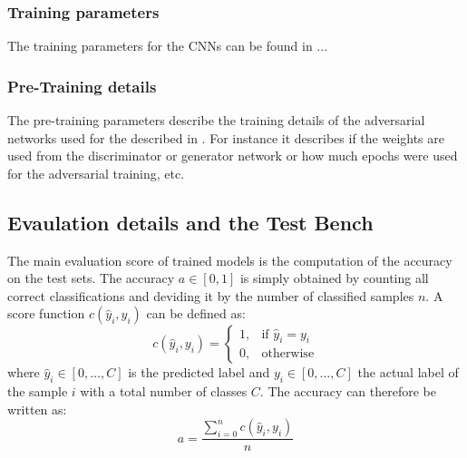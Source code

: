 
\subsubsection{Training parameters}
The training parameters for the CNNs can be found in ...




\subsubsection{Pre-Training details}

The pre-training parameters describe the training details of the adversarial networks used for the  described in .
For instance it describes if the weights are used from the discriminator or generator network or how much epochs were used for the adversarial training, etc.


%
%



\subsection{Evaulation details and the Test Bench}\label{sec:exp_details_tb}
The main evaluation score of trained models is the computation of the accuracy on the test sets.
The accuracy $a \in [0, 1]$ is simply obtained by counting all correct classifications and deviding it by the number of classified samples $n$.
A score function $c(\hat{y}_i, y_i)$ can be defined as:
\begin{equation}
  c(\hat{y}_i, y_i) = 
  \begin{cases}
    1, & \text{if } \hat{y}_i = y_i\\
    0, & \text{otherwise} 
  \end{cases}
\end{equation}
where $\hat{y}_i \in [0, \dots, C]$ is the predicted label and $y_i \in [0, \dots, C]$ the actual label of the sample $i$ with a total number of classes $C$.
The accuracy can therefore be written as:
\begin{equation}
  a = \frac{\sum_{i=0}^n c(\hat{y}_i, y_i)}{n}
\end{equation}

